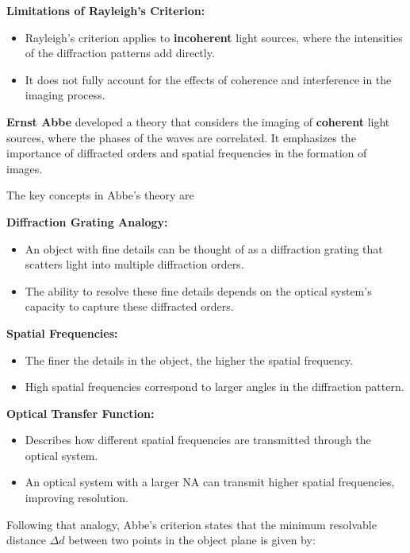 \documentclass[
  a4paper,
]{book}
\providecommand{\tightlist}{%
  \setlength{\itemsep}{0pt}\setlength{\parskip}{0pt}}
\begin{document}
\textbf{Limitations of Rayleigh's Criterion:}

\begin{itemize}
\tightlist
\item
  Rayleigh's criterion applies to \textbf{incoherent} light sources,
  where the intensities of the diffraction patterns add directly.
\item
  It does not fully account for the effects of coherence and
  interference in the imaging process.
\end{itemize}

\textbf{Ernst Abbe} developed a theory that considers the imaging of
\textbf{coherent} light sources, where the phases of the waves are
correlated. It emphasizes the importance of diffracted orders and
spatial frequencies in the formation of images.

The key concepts in Abbe's theory are

\textbf{Diffraction Grating Analogy:}

\begin{itemize}
\tightlist
\item
  An object with fine details can be thought of as a diffraction grating
  that scatters light into multiple diffraction orders.
\item
  The ability to resolve these fine details depends on the optical
  system's capacity to capture these diffracted orders.
\end{itemize}

\textbf{Spatial Frequencies:}

\begin{itemize}
\tightlist
\item
  The finer the details in the object, the higher the spatial frequency.
\item
  High spatial frequencies correspond to larger angles in the
  diffraction pattern.
\end{itemize}

\textbf{Optical Transfer Function:}

\begin{itemize}
\tightlist
\item
  Describes how different spatial frequencies are transmitted through
  the optical system.
\item
  An optical system with a larger NA can transmit higher spatial
  frequencies, improving resolution.
\end{itemize}

Following that analogy, Abbe's criterion states that the minimum
resolvable distance \(\Delta d\) between two points in the object plane
is given by:
\end{document}
